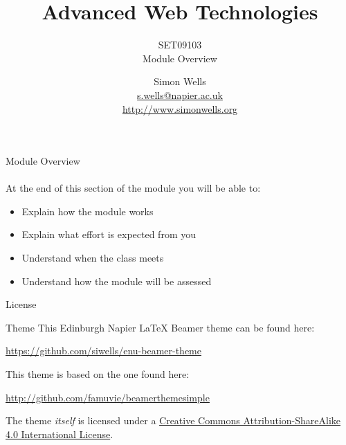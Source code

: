 \documentclass{beamer}
\title{Advanced Web Technologies}
\subtitle{SET09103\\Module Overview}
\date{}%
\author{Simon Wells\\
    \href{mailto:s.wells@napier.ac.uk}{s.wells@napier.ac.uk}\\
    \url{http://www.simonwells.org}}
\institute{\url{http://siwells.github.io/teaching_set09103/}}
\begin{document}
\maketitle

\begin{frame}{Module Overview}
  \framesubtitle{}

  At the end of this section of the module you will be able to:

  \begin{itemize}
    \item Explain how the module works
    \item Explain what effort is expected from you
    \item Understand when the class meets
    \item Understand how the module will be assessed
  \end{itemize}

  
\end{frame}







\begin{frame}{License}

  \begin{block}{Theme}
    This Edinburgh Napier LaTeX Beamer theme can be found here:
    \begin{center}\url{https://github.com/siwells/enu-beamer-theme}\end{center}
    This theme is based on the one found here:
    \begin{center}\url{http://github.com/famuvie/beamerthemesimple}\end{center}
  \end{block}
  
  The theme \emph{itself} is licensed under a
  \href{http://creativecommons.org/licenses/by-sa/4.0/}{Creative Commons
  Attribution-ShareAlike 4.0 International License}.

  \begin{center}\ccbysa\end{center}

\end{frame}
\end{document}

